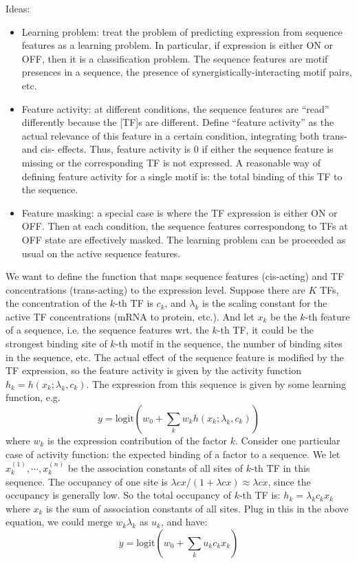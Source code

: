 \documentclass[11pt]{article}
\begin{document}
\begin{enumerate}
\begin{enumerate}
Ideas: 
\begin{itemize}
\item Learning problem: treat the problem of predicting expression from sequence features as a learning problem. In particular, if expression is either ON or OFF, then it is a classification problem. The sequence features are motif presences in a sequence, the presence of synergistically-interacting motif pairs, etc. 
\item Feature activity: at different conditions, the sequence features are ``read'' differently because the [TF]s are different. Define ``feature activity'' as the actual relevance of this feature in a certain condition, integrating both trans- and cis- effects. Thus, feature activity is 0 if either the sequence feature is missing or the corresponding TF is not expressed. A reasonable way of defining feature activity for a single motif is: the total binding of this TF to the sequence. 
\item Feature masking: a special case is where the TF expression is either ON or OFF. Then at each condition, the sequence features correspondong to TFs at OFF state are effectively masked. The learning problem can be proceeded as usual on the active sequence features. 
\end{itemize}

We want to define the function that maps sequence features (cis-acting) and TF concentrations (trans-acting) to the expression level. Suppose there are $K$ TFs, the concentration of the $k$-th TF is $c_k$, and $\lambda_k$ is the scaling constant for the active TF concentrations (mRNA to protein, etc.). And let $x_k$ be the $k$-th feature of a sequence, i.e. the sequence features wrt. the $k$-th TF, it could be the strongest binding site of $k$-th motif in the sequence, the number of binding sites in the sequence, etc. The actual effect of the sequence feature is modified by the TF expression, so the feature activity is given by the activity function $h_k = h(x_k; \lambda_k, c_k)$. The expression from this sequence is given by some learning function, e.g.
\begin{equation}
y = \text{logit}\left( w_0 + \sum_{k}w_{k} h(x_k; \lambda_k, c_k) \right)
\end{equation}
where $w_k$ is the expression contribution of the factor $k$. Consider one particular case of activity function: the expected binding of a factor to a sequence. We let $x_k^{(1)}, \cdots, x_k^{(n)}$ be the association constants of all sites of $k$-th TF in this sequence. The occupancy of one site is $\lambda c x / ( 1 + \lambda c x) \approx \lambda c x$, since the occupancy is generally low. So the total occupancy of $k$-th TF is: $h_k = \lambda_k c_k x_k$ where $x_k$ is the sum of association constants of all sites. Plug in this in the above equation, we could merge $w_k \lambda_k$ as $u_k$, and have:
\begin{equation}
y = \text{logit}\left( w_0 + \sum_{k}u_{k} c_k x_k\right)
\end{equation}


\end{enumerate}
\end{enumerate}
\end{document}
